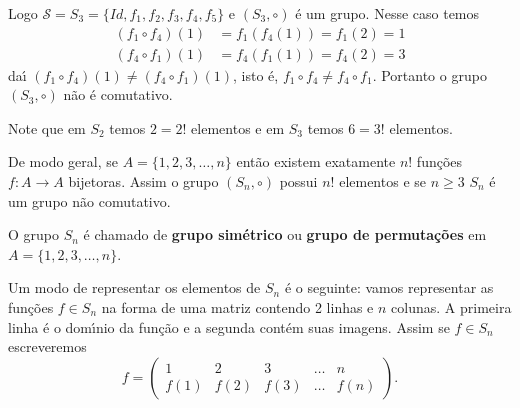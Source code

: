 Logo $\mathcal{S} = S_3 = \{Id, f_1, f_2, f_3, f_4, f_5\}$ e $(S_3, \circ)$ \'e um grupo. Nesse caso temos
\begin{align*}
    (f_1 \circ f_4)(1) &= f_1(f_4(1)) = f_1(2) = 1\\
    (f_4 \circ f_1)(1) &= f_4(f_1(1)) = f_4(2) = 3
\end{align*}
da{\'\i} $(f_1 \circ f_4)(1) \ne (f_4 \circ f_1)(1)$, isto \'e, $f_1 \circ f_4 \ne f_4 \circ f_1$. Portanto o grupo $(S_3, \circ)$ n\~ao \'e comutativo.

Note que em $S_2$ temos $2 = 2!$ elementos e em $S_3$ temos $6 = 3!$ elementos.

De modo geral, se $A = \{1, 2, 3, \dots, n\}$ ent\~ao existem exatamente $n!$ fun\c{c}\~oes $f : A \to A$ bijetoras. Assim o grupo $(S_n, \circ)$ possui $n!$ elementos e se $n \geqslant 3$ $S_n$ \'e um grupo n\~ao comutativo.

\begin{definicao}
    O grupo $S_n$ \'e chamado de \textbf{grupo sim\'etrico} ou \textbf{grupo de permuta\c{c}\~oes} em $A = \{1, 2, 3, \dots, n\}$.
\end{definicao}


Um modo de representar os elementos de $S_n$ \'e o seguinte: vamos representar as fun\c{c}\~oes $f \in S_n$ na forma de uma matriz contendo 2 linhas e $n$ colunas. A primeira linha \'e o dom{\'\i}nio da fun\c{c}\~ao e a segunda cont\'em suas imagens. Assim se $f \in S_n$ escreveremos
\[
    f = \begin{pmatrix}
        1 & 2 & 3 & \dots & n\\
        f(1) & f(2) & f(3) & \dots & f(n)
    \end{pmatrix}.
\]

